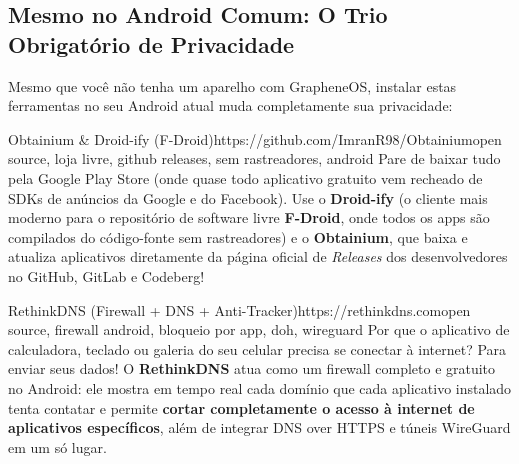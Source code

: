 \documentclass{pousadaguide}
\begin{document}
\subsection{Mesmo no Android Comum: O Trio Obrigatório de Privacidade}

Mesmo que você não tenha um aparelho com GrapheneOS, instalar estas ferramentas no seu Android atual muda completamente sua privacidade:

\begin{ferramenta}[goat,logo=obtainium,logo2=droid-ify]{Obtainium \& Droid-ify (F-Droid)}{https://github.com/ImranR98/Obtainium}{open source, loja livre, github releases, sem rastreadores, android}
Pare de baixar tudo pela Google Play Store (onde quase todo aplicativo gratuito vem recheado de SDKs de anúncios da Google e do Facebook). Use o \textbf{Droid-ify} (o cliente mais moderno para o repositório de software livre \textbf{F-Droid}, onde todos os apps são compilados do código-fonte sem rastreadores) e o \textbf{Obtainium}, que baixa e atualiza aplicativos diretamente da página oficial de \emph{Releases} dos desenvolvedores no GitHub, GitLab e Codeberg! 
\end{ferramenta}

\begin{ferramenta}[goat,logo=rethinkdns]{RethinkDNS (Firewall + DNS + Anti-Tracker)}{https://rethinkdns.com}{open source, firewall android, bloqueio por app, doh, wireguard}
Por que o aplicativo de calculadora, teclado ou galeria do seu celular precisa se conectar à internet? Para enviar seus dados! O \textbf{RethinkDNS} atua como um firewall completo e gratuito no Android: ele mostra em tempo real cada domínio que cada aplicativo instalado tenta contatar e permite \textbf{cortar completamente o acesso à internet de aplicativos específicos}, além de integrar DNS over HTTPS e túneis WireGuard em um só lugar. 
\end{ferramenta}
\end{document}
